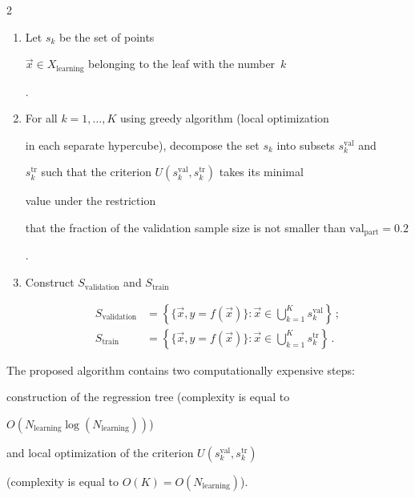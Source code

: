 \begin{multicols}{2}
\begin{enumerate}
{Let the number of leaves of the constructed tree be equal to some $K$}. 

    \item {Let $s_k$ be the set of points 

    $\vec x \in X_{\mathrm{learning}}$ belonging to the leaf with the number~$k$}.

    \item {For all $k = 1, \dots, K$ using greedy algorithm (local optimization 

    in each separate hypercube),  decompose the set $s_k$ into subsets $s_k^{\mathrm{val}}$ and 

    $s_k^{\mathrm{tr}}$ such that the criterion  $U(s_k^{\mathrm{val}}, s_k^{\mathrm{tr}})$ takes its minimal 

    value under the restriction 

    that the fraction of the validation sample size is not smaller than $\mathrm{val}_{\mathrm{part}} = 0.2$}.

    \item {Construct $S_{\mathrm{validation}}$ and} $S_{\mathrm{train}}$

\begin{align*}

S_{\mathrm{validation}} &= \left\{ \{\vec x, y = f(\vec x)\}: \vec x \in 

\bigcup\limits_{k=1}^K  s_k^{\mathrm{val}} \right \}\,; \\

S_{\mathrm{train}} &= \left\{ \{\vec x, y = f(\vec x)\}: \vec x \in 

\bigcup\limits_{k=1}^K  s_k^{\mathrm{tr}} \right \}\,.

\end{align*}

  \end{enumerate}





\medskip



The proposed algorithm contains two computationally expensive steps: 

construction of the regression tree (complexity is equal to 

$O(N_{\mathrm{learning}}\log(N_{\mathrm{learning}}))$)

and local optimization of the criterion $U(s_k^{\mathrm{val}}, s_k^{\mathrm{tr}})$ 

(complexity is equal to $O(K) = O(N_{\mathrm{learning}})$).


\end{multicols}
